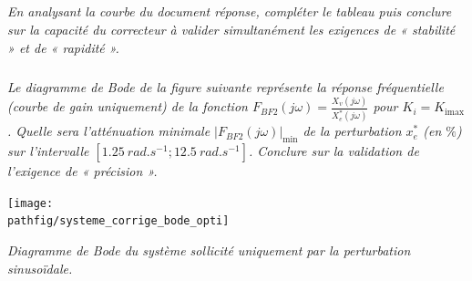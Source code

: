\documentclass[10pt,fleqn]{article} %
\begin{document}
\subparagraph{}\textit{En analysant la courbe du document réponse, compléter le tableau puis conclure sur la capacité du correcteur à valider simultanément les exigences
de « stabilité » et de « rapidité ».
}
%
%
%
%
%
%
%
%


\subparagraph{}\textit{Le diagramme de Bode de la figure suivante représente la réponse fréquentielle (courbe de gain
uniquement) de la fonction $F_{BF2}(j \omega) = \frac{X_v(j \omega)}{X_e^*(j \omega)}$ pour $K_i = K_{\text{imax}}$. Quelle sera l'atténuation minimale $|F_{BF2}(j \omega)|_{\text{min}}$ de la perturbation $x_e^*$
(en $\%$) sur l'intervalle $[\SI{1,25}{rad.s^{-1}}; \SI{12,5}{rad.s^{-1}}]$.
Conclure sur la validation de l'exigence de « précision ».}



\begin{center}%

\texttt{[image: \\pathfig/systeme\_corrige\_bode\_opti]}

\textit{Diagramme de Bode du système sollicité uniquement par la perturbation sinusoïdale.
\label{chap2:tele:19}}
\end{center}
\end{document}
